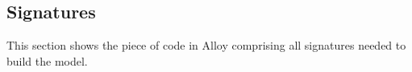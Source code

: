 \subsection{Signatures}

This section shows the piece of code in Alloy comprising all signatures needed to build the model.\\



 

